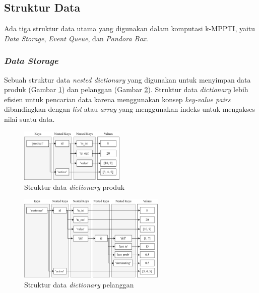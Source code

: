 \documentclass[conference]{IEEEtran}
\begin{document}
\subsection{Struktur Data}
Ada tiga struktur data utama yang digunakan dalam komputasi k-MPPTI, yaitu \textit{Data Storage}, \textit{Event Queue}, dan \textit{Pandora Box}.

\subsubsection{\textbf{\textit{Data Storage}}}
Sebuah struktur data \textit{nested dictionary} yang digunakan untuk menyimpan data produk (Gambar \ref{fig:sd1}) dan pelanggan (Gambar \ref{fig:sd2}). Struktur data \textit{dictionary} lebih efisien untuk pencarian data karena menggunakan konsep \textit{key-value pairs} dibandingkan dengan \textit{list} atau \textit{array} yang menggunakan indeks untuk mengakses nilai suatu data. 

\begin{figure}[htbp]
	\centering
	\includegraphics[width=5cm]{img/bab3/sd1.png}
	\caption{Struktur data \textit{dictionary} produk}
	\label{fig:sd1}
\end{figure}

\begin{figure}[htbp]
	\centering
	\includegraphics[width=7cm]{img/bab3/sd2.png}
	\caption{Struktur data \textit{dictionary} pelanggan}
	\label{fig:sd2}
\end{figure}
\end{document}
